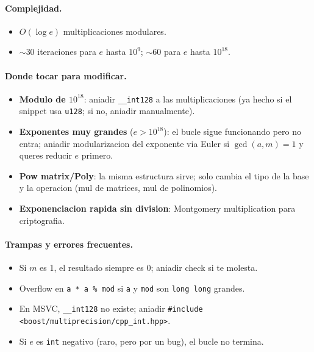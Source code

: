 \paragraph{Complejidad.}
\begin{itemize}\setlength\itemsep{0pt}
	\item $O(\log e)$ multiplicaciones modulares.
	\item $\sim 30$ iteraciones para $e$ hasta $10^9$; $\sim 60$ para $e$ hasta $10^{18}$.
\end{itemize}

\paragraph{Donde tocar para modificar.}
\begin{itemize}\setlength\itemsep{0pt}
	\item \textbf{Modulo de $10^{18}$}: aniadir \texttt{\_\_int128} a las multiplicaciones (ya hecho si el snippet usa \texttt{u128}; si no, aniadir manualmente).
	\item \textbf{Exponentes muy grandes} ($e > 10^{18}$): el bucle sigue funcionando pero no entra; aniadir modularizacion del exponente via Euler si $\gcd(a, m) = 1$ y queres reducir $e$ primero.
	\item \textbf{Pow matrix/Poly}: la misma estructura sirve; solo cambia el tipo de la base y la operacion (mul de matrices, mul de polinomios).
	\item \textbf{Exponenciacion rapida sin division}: Montgomery multiplication para criptografia.
\end{itemize}

\paragraph{Trampas y errores frecuentes.}
\begin{itemize}\setlength\itemsep{0pt}
	\item Si $m$ es 1, el resultado siempre es 0; aniadir check si te molesta.
	\item Overflow en \texttt{a * a \% mod} si \texttt{a} y \texttt{mod} son \texttt{long long} grandes.
	\item En MSVC, \texttt{\_\_int128} no existe; aniadir \texttt{\#include <boost/multiprecision/cpp\_int.hpp>}.
	\item Si $e$ es \texttt{int} negativo (raro, pero por un bug), el bucle no termina.
\end{itemize}

